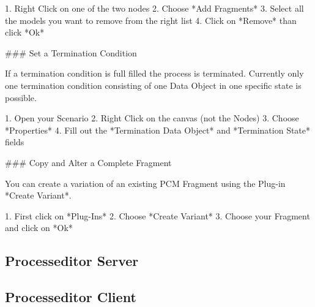 \documentclass{acm_proc_article-sp}
\begin{document}
\begin{markdown}
1. Right Click on one of the two nodes
2. Choose *Add Fragments*
3. Select all the models you want to remove from the right list
4. Click on *Remove* than click *Ok*

### Set a Termination Condition

If a termination condition is full filled the process is terminated.
Currently only one termination condition consisting of one Data Object in one specific state is possible.

1. Open your Scenario
2. Right Click on the canvas (not the Nodes)
3. Choose *Properties*
4. Fill out the *Termination Data Object* and *Termination State* fields

### Copy and Alter a Complete Fragment

You can create a variation of an existing PCM Fragment using the Plug-in *Create Variant*.

1. First click on *Plug-Ins*
2. Choose *Create Variant*
3. Choose your Fragment and click on *Ok*
\end{markdown}


%
%
\subsection{Processeditor Server}


%
%
\subsection{Processeditor Client}


%
%

%
 

%
%
\end{document}
